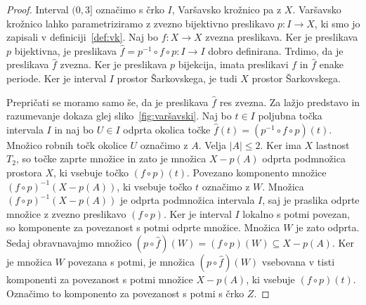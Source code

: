 \documentclass[../TG_magistrsko_delo_sections.tex]{subfiles}
\begin{document}
\begin{proof}
Interval $(0, 3]$ označimo s črko $I$, Varšavsko krožnico pa z $X$. Varšavsko krožnico lahko parametriziramo z zvezno bijektivno preslikavo $p \colon I \to X$, ki smo jo zapisali v definiciji~\ref{def:vk}. Naj bo $f \colon X \to X$ zvezna preslikava. Ker je preslikava $p$ bijektivna, je preslikava $\widehat{f} = p^{-1} \circ f \circ p \colon I \to I$ dobro definirana. Trdimo, da je preslikava $\widehat{f}$ zvezna. Ker je preslikava $p$ bijekcija, imata preslikavi $f$ in $\widehat{f}$ enake periode. Ker je interval $I$ prostor Šarkovskega, je tudi $X$ prostor Šarkovskega. 

Prepričati se moramo samo še, da je preslikava $\widehat{f}$ res zvezna. Za lažjo predstavo in razumevanje dokaza glej sliko~\ref{fig:varšavski}. Naj bo $t \in I$ poljubna točka intervala $I$ in naj bo $U \in I$ odprta okolica točke $\widehat{f}(t) = (p^{-1} \circ f \circ p)(t)$. Množico robnih točk okolice $U$ označimo z $A$. Velja $|A| \leq 2$. Ker ima $X$ lastnost $T_2$, so točke zaprte množice in zato je množica $X - p(A)$ odprta podmnožica prostora $X$, ki vsebuje točko $(f \circ p)(t)$. Povezano komponento množice $(f \circ p)^{-1}(X-p(A))$, ki vsebuje točko $t$ označimo z $W$. Množica $(f \circ p)^{-1}(X-p(A))$ je odprta podmnožica intervala $I$, saj je praslika odprte množice z zvezno preslikavo $(f \circ p)$. Ker je interval $I$ lokalno s potmi povezan, so komponente za povezanost s potmi odprte množice. Množica $W$ je zato odprta. Sedaj obravnavajmo množico $\left(p \circ \widehat{f}\right) (W) = (f \circ p)(W) \subseteq X - p(A)$. Ker je množica $W$ povezana s potmi, je množica $\left(p \circ \widehat{f} \right) (W)$ vsebovana v tisti komponenti za povezanost s potmi množice $X-p(A)$, ki vsebuje $(f \circ p)(t)$. Označimo to komponento za povezanost s potmi s črko $Z$. 


\end{proof}
\end{document}
